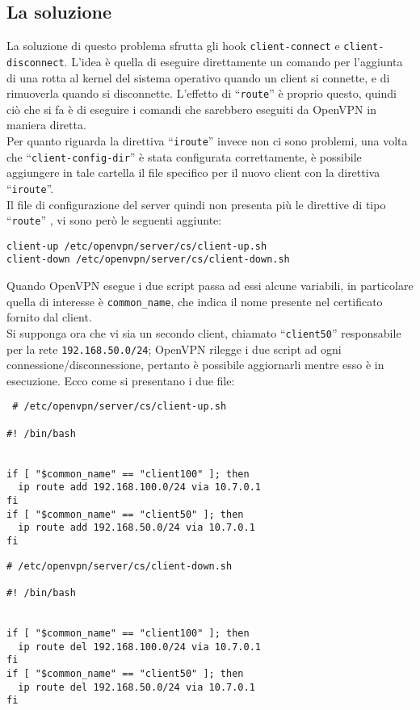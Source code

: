 \subsection{La soluzione}
La soluzione di questo problema sfrutta gli hook \texttt{client-connect} e
\texttt{client-disconnect}. L'idea è
quella di eseguire direttamente un comando per l'aggiunta di una rotta al
kernel del sistema operativo quando un client si connette, e di rimuoverla quando
si disconnette. L'effetto di ``\texttt{route}'' è proprio questo, quindi ciò che si fa
è di eseguire i comandi che sarebbero eseguiti da OpenVPN in maniera diretta.\\
Per quanto riguarda la direttiva ``\texttt{iroute}'' invece non ci sono problemi,
una volta che ``\texttt{client-config-dir}'' è stata configurata correttamente, è
possibile aggiungere in tale cartella il file specifico per il nuovo client con la
direttiva ``\texttt{iroute}''.\\
Il file di configurazione del server quindi non presenta più le direttive
di tipo ``\texttt{route}'' %
, vi sono però le seguenti aggiunte:
\begin{verbatim}
client-up /etc/openvpn/server/cs/client-up.sh
client-down /etc/openvpn/server/cs/client-down.sh
\end{verbatim}
Quando OpenVPN esegue i due script passa ad essi alcune variabili, in particolare
quella di interesse è \texttt{common\_name}, che indica il nome
presente nel certificato fornito dal client.\\
Si supponga ora che vi sia un secondo
client, chiamato ``\texttt{client50}'' responsabile per la rete \texttt{192.168.50.0/24};
OpenVPN rilegge i due script ad ogni connessione/disconnessione, pertanto è possibile
aggiornarli mentre esso è in esecuzione.
Ecco come si presentano i due file:
\begin{verbatim}
 # /etc/openvpn/server/cs/client-up.sh

#! /bin/bash


if [ "$common_name" == "client100" ]; then
  ip route add 192.168.100.0/24 via 10.7.0.1
fi
if [ "$common_name" == "client50" ]; then
  ip route add 192.168.50.0/24 via 10.7.0.1
fi
\end{verbatim}
\begin{verbatim}
# /etc/openvpn/server/cs/client-down.sh

#! /bin/bash


if [ "$common_name" == "client100" ]; then
  ip route del 192.168.100.0/24 via 10.7.0.1
fi
if [ "$common_name" == "client50" ]; then
  ip route del 192.168.50.0/24 via 10.7.0.1
fi
\end{verbatim}
